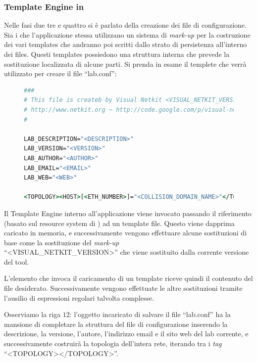 \subsubsection*{Template Engine in \visualnetkit{}}
Nelle fasi due tre e quattro si è parlato della creazione dei file di configurazione. Sia i \plugin{} che l'applicazione stessa utilizzano un sistema di \emph{mark-up} per la costruzione dei vari templates che andranno poi scritti dallo strato di persistenza all'interno dei files. Questi templates possiedono una struttura interna che prevede la sostituzione localizzata di alcune parti. Si prenda in esame il templete che verrà utilizzato per creare il file ``lab.conf'':

\begin{figure}[!htb]
\begin{lstlisting}[language=csh]
###
# This file is createb by Visual Netkit <VISUAL_NETKIT_VERSION> version
# http://www.netkit.org ~ http://code.google.com/p/visual-netkit/
#

LAB_DESCRIPTION="<DESCRIPTION>"
LAB_VERSION="<VERSION>"
LAB_AUTHOR="<AUTHOR>"
LAB_EMAIL="<EMAIL>"
LAB_WEB="<WEB>"

<TOPOLOGY><HOST>[<ETH_NUMBER>]="<COLLISION_DOMAIN_NAME>"</TOPOLOGY>
\end{lstlisting}
\end{figure}
Il Template Engine interno all'applicazione viene invocato passando il riferimento (basato sul resource system di \qt{}) ad un template file. Questo viene dapprima caricato in memoria, e successivamente vengono effettuare alcune sostituzioni di base come la sostituzione del \emph{mark-up}\\
``<VISUAL\_{}NETKIT\_{}VERSION>'' che viene sostituito dalla corrente versione del tool.

L'elemento che invoca il caricamento di un template riceve quindi il contenuto del file desiderato. Successivamente vengono effettuate le altre sostituzioni tramite l'ausilio di espressioni regolari talvolta complesse.

Osserviamo la riga $12$: l'oggetto incaricato di salvare il file ``lab.conf'' ha la mansione di completare la struttura del file di configurazione inserendo la descrizione, la versione, l'autore, l'indirizzo email e il sito web del lab corrente, e successivamente costruirà la topologia dell'intera rete, iterando tra i \emph{tag} ``<TOPOLOGY></TOPOLOGY>''.

